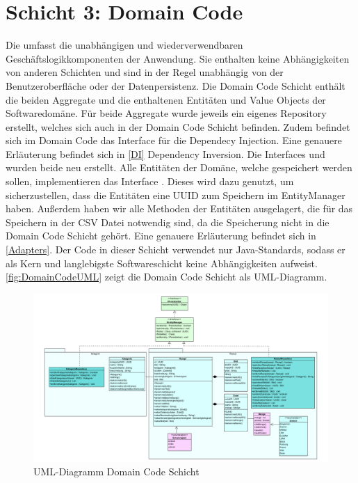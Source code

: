 \section{Schicht 3: Domain Code}
Die \href{https://github.com/MichaelaHaag/RezeptApp/tree/main/3-Domain-Code}{} umfasst die unabhängigen und wiederverwendbaren Geschäftslogikkomponenten der Anwendung. Sie enthalten keine Abhängigkeiten von anderen Schichten und sind in der Regel unabhängig von der Benutzeroberfläche oder der Datenpersistenz.
Die Domain Code Schicht enthält die beiden Aggregate und die enthaltenen Entitäten und Value Objects der Softwaredomäne. Für beide Aggregate wurde jeweils ein eigenes Repository erstellt, welches sich auch in der Domain Code Schicht befinden. Zudem befindet sich im Domain Code das Interface \href{https://github.com/MichaelaHaag/RezeptApp/tree/main/3-Domain-Code/src/main/java/de/rezeptapp/domain/IEntityManager.java}{} für die Dependecy Injection. Eine genauere Erläuterung befindet sich in \autoref{DI} Dependency Inversion. Die Interfaces  und \href{https://github.com/MichaelaHaag/RezeptApp/tree/main/3-Domain-Code/src/main/java/de/rezeptapp/domain/IPersistierbar.java}{} wurden beide neu erstellt. Alle Entitäten der Domäne, welche gespeichert werden sollen, implementieren das Interface . Dieses wird dazu genutzt, um sicherzustellen, dass die Entitäten eine UUID zum Speichern im EntityManager haben. Außerdem haben wir alle Methoden der Entitäten ausgelagert, die für das Speichern in der CSV Datei notwendig sind, da die Speicherung nicht in die Domain Code Schicht gehört. Eine genauere Erläuterung befindet sich in \autoref{Adapters}.
Der Code in dieser Schicht verwendet nur Java-Standards, sodass er als Kern und langlebigste Softwareschicht keine Abhängigkeiten aufweist. \autoref{fig:DomainCodeUML} zeigt die Domain Code Schicht als UML-Diagramm. 
\begin{figure}[ht]
	\centering
	\includegraphics[width=1.0\textwidth]{Bilder/DomainCode-UML.png} 
	\caption{UML-Diagramm Domain Code Schicht}
	\label{fig:DomainCodeUML}
\end{figure}

